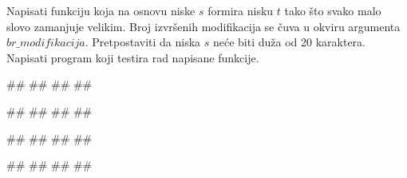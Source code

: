 \begin{Exercise}[label=p2.6_06] 
 Napisati funkciju  koja na osnovu niske $s$ formira nisku $t$ tako što svako malo slovo zamanjuje velikim. Broj izvršenih modifikacija se čuva u okviru argumenta $br\_modifikacija$. Pretpostaviti da niska $s$ neće biti duža od 20 karaktera. Napisati program koji testira rad napisane funkcije. 

\begin{miditest}
\begin{upotreba}{1}
#\naslovInt#
##
##
##
\end{upotreba}
\end{miditest}
\begin{miditest}
\begin{upotreba}{2}
#\naslovInt#
##
##
##
\end{upotreba}
\end{miditest}

\begin{miditest}
\begin{upotreba}{3}
#\naslovInt#
##
##
##
\end{upotreba}
\end{miditest}
\begin{miditest}
\begin{upotreba}{4}
#\naslovInt#
##
##
##
\end{upotreba}
\end{miditest}

\end{Exercise}
\ifresenja
\begin{Answer}[ref=p2.6_06]
\end{Answer}
 \fi


